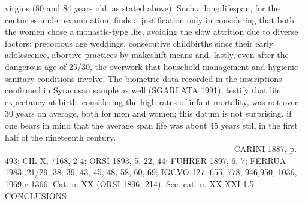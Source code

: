 \documentclass[amsthm,ebook]{saparticle}
\begin{document}
virgins (80 and 84 years old, as stated above). Such a long lifespan, for the centuries under examination, finds a justification only in considering that both the women chose a monastic-type life, avoiding the slow attrition due to diverse factors: precocious age weddings, consecutive childbirths since their early adolescence, abortive practices by makeshift means and, lastly, even after the dangerous age of 25/30, the overwork that household management and hygienic-sanitary conditions involve. The biometric data recorded in the inscriptions confirmed in Syracusan sample as well (SGARLATA 1991), testify that life expectancy at birth, considering the high rates of infant mortality, was not over 30 years on average, both for men and women; this datum is not surprising, if one bears in mind that the average span life was about 45 years still in the first half of the nineteenth century.
____________________________________
CARINI 1887, p. 493; CIL X, 7168, 2-4; ORSI 1893, 5, 22, 44; FUHRER 1897, 6, 7; FERRUA 1983, 21/29, 38, 39, 43, 45, 48, 58, 60, 69; IGCVO 127, 655, 778, 946,950, 1036, 1069 e 1366.
Cat. n. XX (ORSI 1896, 214). See. cat. n. XX-XXI
1.5 CONCLUSIONS
\end{document}
